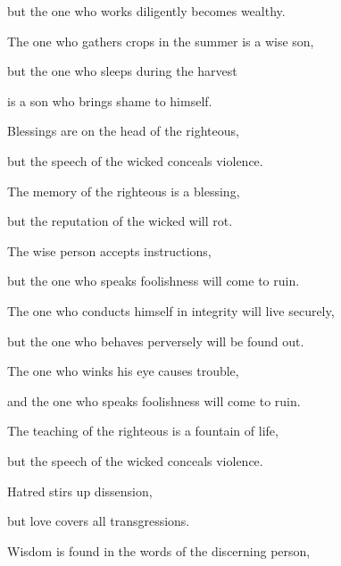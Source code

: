 {\par }{\Q but
the one who
works diligently
becomes wealthy.
\par }{\Q {}The one who gathers
crops in the summer
is a wise
son,
\par }{\Q but
the one who sleeps
during the harvest
\par }{\Q is a son
who brings shame to himself.
\par }{\Q {}Blessings
are on the head
of the righteous,
\par }{\Q but the speech
of the wicked
conceals
violence.
\par }{\Q {}The memory
of the righteous
is a blessing,
\par }{\Q but the reputation
of the wicked
will rot.
\par }{\Q {}The wise
person
accepts
instructions,
\par }{\Q but the one who speaks
foolishness
will come to ruin.
\par }{\Q {}The one who conducts
himself in integrity
will live
securely,
\par }{\Q but the one who behaves perversely
will be found out.
\par }{\Q {}The one who winks
his eye
causes
trouble,
\par }{\Q and the one who speaks
foolishness
will come to ruin.
\par }{\Q {}The teaching
of the righteous
is a fountain
of life,
\par }{\Q but
the speech
of the wicked
conceals
violence.
\par }{\Q {}Hatred
stirs up
dissension,
\par }{\Q but
love
covers
all
transgressions.
\par }{\Q {}Wisdom
is found
in the words
of the discerning
person,

}
